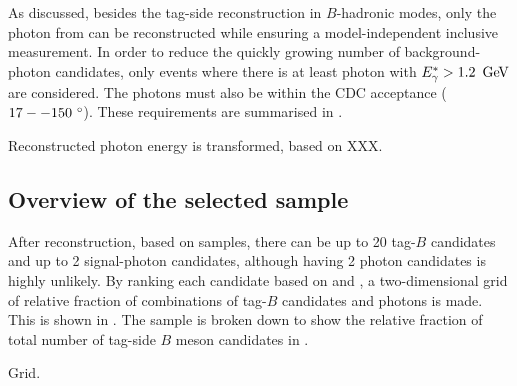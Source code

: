 As discussed, besides the tag-side reconstruction in $B$-hadronic modes, only the photon from \BtoXsgamma can be reconstructed while ensuring a model-independent inclusive measurement.
In order to reduce the quickly growing number of background-photon candidates, only events where there is at least photon with ${E^*_{\gamma}}>1.2~\mathrm{\,Ge\kern -0.1em V}$ are considered.
The photons must also be within the CDC acceptance ($17--150~^{\circ}$).
These requirements are summarised in .
\begin{table}[htbp!]
    \centering
     \caption{\label{tab:photon_requirements} Requirements for photons in reconstructed events.}
\end{table}

Reconstructed photon energy is transformed, based on XXX.

\subsection{Overview of the selected sample}

After reconstruction, based on \MC samples, there can be up to 20 tag-$B$ candidates and up to 2 signal-photon candidates, although having 2 photon candidates is highly unlikely.
By ranking each candidate based on \EB and \feiProb, a two-dimensional grid of relative fraction of combinations of tag-$B$ candidates and photons is made.
This is shown in .
The sample is broken down to show the relative fraction of total number of tag-side $B$ meson candidates in .

\begin{table}[htbp!]
    \caption{\label{tab:grid_photon_fei} Grid.}
    
\end{table}

